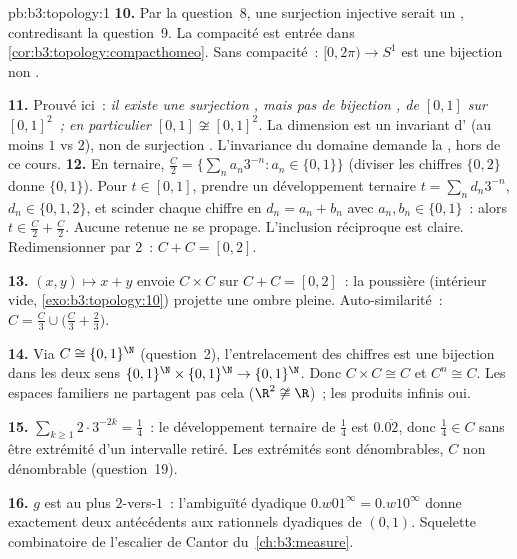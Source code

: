 \begin{solution}{pb:b3:topology:1}
\textbf{10.} Par la question~8, une surjection 
injective serait un , contredisant la
question~9. La compacité est entrée dans
\cref{cor:b3:topology:compacthomeo}. Sans compacité~: $[0,
2\pi) \to S^1$ est une bijection  non .

\textbf{11.} Prouvé ici~: \emph{il existe une surjection
, mais pas de bijection , de $[0,1]$ sur
$[0,1]^2$~; en particulier $[0,1] \not\cong [0,1]^2$.} La
dimension est un invariant d' (au moins $1$ vs
$2$), non de surjection . L'invariance du domaine
demande la  , hors de ce cours.
\textbf{12.} En ternaire, $\frac C2 = \{\sum_na_n3^{-n} :
a_n \in \{0, 1\}\}$ (diviser les chiffres $\{0,2\}$ donne
$\{0,1\}$). Pour $t \in [0,1]$, prendre un développement
ternaire $t = \sum_nd_n3^{-n}$, $d_n \in \{0,1,2\}$, et
scinder chaque chiffre en $d_n = a_n + b_n$ avec $a_n, b_n
\in \{0,1\}$~: alors $t \in \frac C2 + \frac C2$. Aucune
retenue ne se propage. L'inclusion réciproque est claire.
Redimensionner par $2$~: $C + C = [0,2]$.

\textbf{13.} $(x, y) \mapsto x + y$ envoie $C \times C$ sur
$C + C = [0,2]$~: la poussière (intérieur vide,
\cref{exo:b3:topology:10}) projette une ombre pleine.
Auto-similarité~: $C = \frac C3 \cup \bigl(\frac C3 +
\frac23\bigr)$.

\textbf{14.} Via $C \cong \{0,1\}^\N$ (question~2),
l'entrelacement des chiffres est une bijection  dans
les deux sens $\{0,1\}^\N\times\{0,1\}^\N \to
\{0,1\}^\N$. Donc $C\times C \cong C$ et $C^n \cong C$.
Les espaces familiers ne partagent pas cela ($\R^2 \not\cong
\R$)~; les produits infinis oui.

\textbf{15.} $\sum_{k\geq1}2\cdot3^{-2k} = \frac14$~: le
développement ternaire de $\frac14$ est $0.\overline{02}$,
donc $\frac14 \in C$ sans être extrémité d'un intervalle
retiré. Les extrémités sont dénombrables, $C$ non dénombrable
(question~19).

\textbf{16.} $g$ est au plus $2$-vers-$1$~: l'ambiguïté
dyadique $0.w01^\infty = 0.w10^\infty$ donne exactement deux
antécédents aux rationnels dyadiques de $(0,1)$. Squelette
combinatoire de l'escalier de Cantor du~\cref{ch:b3:measure}.


\end{solution}
